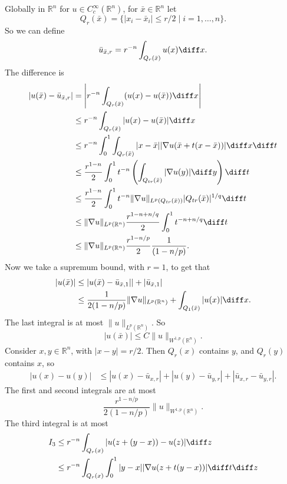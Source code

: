 \documentclass[12pt]{article}
\begin{document}
\begin{proofbox}
	Globally in $\mathbb{R}^n$ for $u \in C_c^\infty(\mathbb{R}^n)$, for $\bar x \in \mathbb{R}^n$ let
	\[
		Q_r(\bar x) = \{ |x_i - \bar x_i| \leq r/2 \mid i = 1, \ldots, n\}.
	\]
	So we can define
	\[
	\bar u_{\bar x, r} = r^{-n} \int_{Q_r(\bar x)} u(x) \diff x.
	\]
	The difference is
	\begin{align*}
		|u(\bar x) - \bar u_{\bar x, r}| &= \left| r^{-n} \int_{Q_r(\bar x)} (u(x) - u(\bar x)) \diff x\right| \\
						 &\leq r^{-n} \int_{Q_r(\bar x)} |u(x) - u (\bar x)| \diff x \\
						 &\leq r^{-n} \int_0^1 \int_{Q_r(\bar x)} |x - \bar x| |\nabla u(\bar x + t(x - \bar x))| \diff x \diff t \\
						 &\leq \frac{r^{1-n}}{2} \int_0^1 t^{-n} \left( \int_{Q_{tr}(\bar x)} |\nabla u(y)| \diff y \right) \diff t \\
						 &\leq \frac{r^{1-n}}{2} \int_0^1 t^{-n} \|\nabla u\|_{L^p(Q_{tr}(\bar x))} |Q_{tr}(\bar x)|^{1/q} \diff t \\
						 &\leq \|\nabla u\|_{L^p(\mathbb{R}^n)} \frac{r^{1 -n + n/q}}{2} \int_0^1 t^{-n + n/q} \diff t \\
						 &\leq \|\nabla u\|_{L^p(\mathbb{R}^n)} \frac{r^{1 - n/p}}{2} \frac{1}{(1 - n/p)}.
	\end{align*}
	Now we take a supremum bound, with $r = 1$, to get that
	\begin{align*}
		|u(\bar x)| &\leq |u(\bar x) - \bar u_{\bar x, 1}| | + |\bar u_{\bar x, 1}| \\
			    &\leq \frac{1}{2(1 - n/p)} \|\nabla u\|_{L^p(\mathbb{R}^n)} + \int_{Q_1(\bar x)} |u(x)| \diff x.
	\end{align*}
	The last integral is at most $\|u\|_{L^p(\mathbb{R}^n)}$. So
	\[
	|u(\bar x)| \leq C \|u\|_{W^{1, p}(\mathbb{R}^n)}.
	\]
	Consider $x, y \in \mathbb{R}^n$, with $|x - y| =  r/2$. Then $Q_r(x)$ contains $y$, and $Q_r(y)$ contains $x$, so
	\begin{align*}
		|u(x) - u(y)| & \leq |u(x) - \bar u_{x, r}| + |u(y) - \bar u_{y, r}| + |\bar u_{x, r} - \bar u_{y, r}|.
	\end{align*}
	The first and second integrals are at most
	\[
	\frac{r^{1 - n/p}}{2(1 - n/p)} \|u\|_{W^{1,p}(\mathbb{R}^n)}.
	\]
	The third integral is at most
	\begin{align*}
		I_3 &\leq r^{-n} \int_{Q_r(x)} |u(z + (y - x)) - u(z)| \diff z \\
		    &\leq r^{-n} \int_{Q_r(x)} \int_0^1 |y - x| |\nabla u(z + t(y - x))| \diff t \diff z \\

\end{align*}
\end{proofbox}
\end{document}
